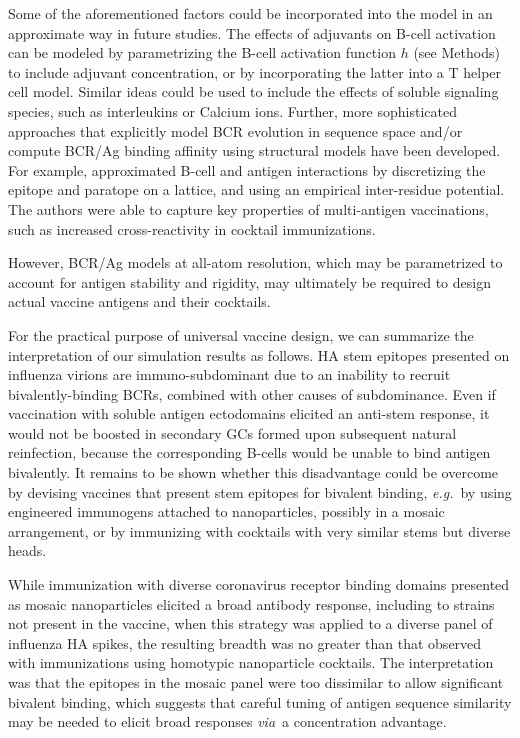 \documentclass[utf8]{frontiersHLTH}%
\newcommand{\cred}[1]{#1} %
\def\eg {{\it e.g.}}
\def\via {{\it via}}
\begin{document}
Some of the aforementioned factors could be incorporated into the model
in an approximate way in future studies.
%
\cred{The effects of adjuvants on B-cell activation can be modeled by
parametrizing the B-cell activation function $h$ (see Methods) to include
adjuvant concentration, or by incorporating the latter into a T helper cell model.
Similar ideas could be used to include the effects of soluble signaling
species, such as interleukins or Calcium ions.}
%
\cred{Further, more sophisticated approaches that explicitly model BCR evolution in
sequence space and/or compute BCR/Ag binding affinity using structural models have been developed.
For example, \citet{robert21}
approximated B-cell and antigen interactions by discretizing the epitope
and paratope on a lattice, and using an empirical inter-residue
potential.\cite{robert21} The authors were able to capture key properties 
of multi-antigen vaccinations, such as increased cross-reactivity in
cocktail immunizations.}
%
\cred{
However, BCR/Ag models at all-atom resolution,\cite{conti21,sprenger21}
which may be parametrized to account for antigen stability and rigidity,
may ultimately be required to design actual vaccine antigens and their
cocktails.
}

\cred{For the practical purpose of universal vaccine
design, we can summarize the interpretation of our simulation results as
follows.  HA stem epitopes presented on influenza virions are
immuno-subdominant due to an inability to recruit bivalently-binding
BCRs, combined with other causes of subdominance. Even if vaccination with
soluble antigen ectodomains elicited an anti-stem response, it would not
be boosted in secondary GCs formed upon subsequent natural reinfection, 
because the corresponding B-cells would be unable to bind antigen
bivalently. It remains to be shown whether this disadvantage could be
overcome by devising vaccines that present stem epitopes for bivalent
binding, \eg~by using engineered immunogens attached to
nanoparticles,\cite{corbett19} possibly in a mosaic
arrangement\cite{cohen21}, or by immunizing with cocktails with very
similar stems but diverse heads\cite{glanville20}.}

\cred{While
immunization with diverse coronavirus receptor binding domains presented
as mosaic nanoparticles elicited a broad antibody response, including to
strains not present in the vaccine,\cite{cohen21} when this strategy was
applied to a diverse panel of influenza HA spikes, the resulting breadth
was no greater than that observed with immunizations using homotypic
nanoparticle cocktails.\cite{cohen21a} The interpretation was that the
epitopes in the mosaic panel were too dissimilar to allow significant
bivalent binding, which suggests that careful tuning of antigen sequence
similarity may be needed to elicit broad responses \via~a concentration
advantage.}
\end{document}
